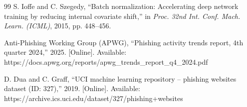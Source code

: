 \documentclass[conference]{IEEEtran}
\begin{document}
\begin{thebibliography}{99}
S. Ioffe and C. Szegedy, ``Batch normalization: Accelerating deep network training by reducing internal covariate shift,'' in \textit{Proc. 32nd Int. Conf. Mach. Learn. (ICML)}, 2015, pp. 448--456.

Anti-Phishing Working Group (APWG), ``Phishing activity trends report, 4th quarter 2024,'' 2025. [Online]. Available: https://docs.apwg.org/reports/apwg\_trends\_report\_q4\_2024.pdf

D. Dua and C. Graff, ``UCI machine learning repository -- phishing websites dataset (ID: 327),'' 2019. [Online]. Available: https://archive.ics.uci.edu/dataset/327/phishing+websites

\end{thebibliography}
\end{document}
